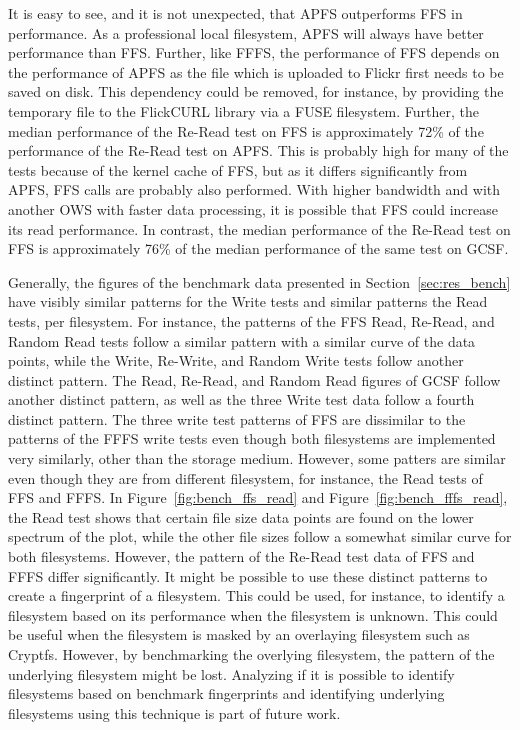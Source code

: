 It is easy to see, and it is not unexpected, that \gls{APFS} outperforms \gls{FFS} in performance. As a professional local filesystem, \gls{APFS} will always have better performance than FFS. Further, like \gls{FFFS}, the performance of \gls{FFS} depends on the performance of \gls{APFS} as the file which is uploaded to Flickr first needs to be saved on disk. This dependency could be removed, for instance, by providing the temporary file to the FlickCURL library via a \gls{FUSE} filesystem. Further, the median performance of the \mbox{Re-Read} test on \gls{FFS} is approximately 72\% of the performance of the \mbox{Re-Read} test on \gls{APFS}. This is probably high for many of the tests because of the kernel cache of \gls{FFS}, but as it differs significantly from \gls{APFS}, \gls{FFS} calls are probably also performed. With higher bandwidth and with another \gls{OWS} with faster data processing, it is possible that \gls{FFS} could increase its read performance. In contrast, the median performance of the \mbox{Re-Read} test on \gls{FFS} is approximately 76\% of the median performance of the same test on \gls{GCSF}.

Generally, the figures of the benchmark data presented in Section~\ref{sec:res_bench} have visibly similar patterns for the Write tests and similar patterns the Read tests, per filesystem. For instance, the patterns of the \gls{FFS} Read, \mbox{Re-Read}, and Random Read tests follow a similar pattern with a similar curve of the data points, while the Write, \mbox{Re-Write}, and Random Write tests follow another distinct pattern. The Read, \mbox{Re-Read}, and Random Read figures of \gls{GCSF} follow another distinct pattern, as well as the three Write test data follow a fourth distinct pattern. The three write test patterns of \gls{FFS} are dissimilar to the patterns of the \gls{FFFS} write tests even though both filesystems are implemented very similarly, other than the storage medium. However, some patters are similar even though they are from different filesystem, for instance, the Read tests of \gls{FFS} and \gls{FFFS}. In Figure~\ref{fig:bench_ffs_read} and Figure~\ref{fig:bench_fffs_read}, the Read test shows that certain file size data points are found on the lower spectrum of the plot, while the other file sizes follow a somewhat similar curve for both filesystems. However, the pattern of the \mbox{Re-Read} test data of \gls{FFS} and \gls{FFFS} differ significantly. It might be possible to use these distinct patterns to create a fingerprint of a filesystem. This could be used, for instance, to identify a filesystem based on its performance when the filesystem is unknown. This could be useful when the filesystem is masked by an overlaying filesystem such as Cryptfs. However, by benchmarking the overlying filesystem, the pattern of the underlying filesystem might be lost. Analyzing if it is possible to identify filesystems based on benchmark fingerprints and identifying underlying filesystems using this technique is part of future work.

